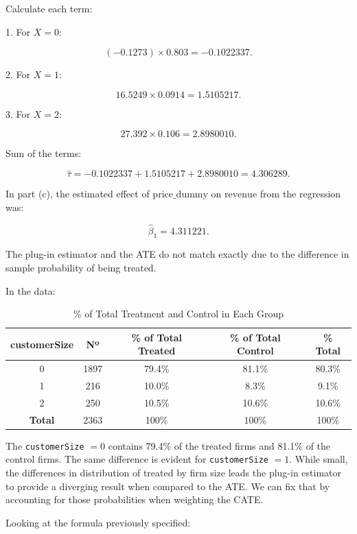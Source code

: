 \documentclass{article}
\begin{document}
Calculate each term:

1. For \(X = 0\):

\[
(-0.1273) \times 0.803 = -0.1022337.
\]

2. For \(X = 1\):

\[
16.5249 \times 0.0914 = 1.5105217.
\]

3. For \(X = 2\):

\[
27.392 \times 0.106 = 2.8980010.
\]

Sum of the terms:

\[
\hat{\tau} = -0.1022337 + 1.5105217 + 2.8980010 = 4.306289.
\]

In part (c), the estimated effect of \(\text{price\_dummy}\) on \(\text{revenue}\) from the regression was:

\[
\hat{\beta}_1 = 4.311221.
\]

The plug-in estimator and the ATE do not match exactly due to the difference in sample probability of being treated.

In the data:

\begin{table}[H]
    \centering
    \begin{tabular}{|c|c|c|c|c|}
    \hline
    \textbf{customerSize} & \textbf{Nº} & \textbf{\% of Total Treated}
    & \textbf{\% of Total Control} & \textbf{\% Total} \\
    \hline
    0 & 1897 & 79.4\% & 81.1\% & 80.3\% \\
    1 & 216 & 10.0\% & 8.3\% & 9.1\% \\
    2 & 250 & 10.5\% & 10.6\% & 10.6\% \\
    \hline
    \textbf{Total} & 2363 & 100\% & 100\% & 100\% \\
    \hline
    \end{tabular}
    \caption{\% of Total Treatment and Control in Each Group}
    \label{tab:earnings_distribution}
\end{table}

The \texttt{customerSize} $= 0$ contains 79.4\% of the treated firms and 81.1\% of the control firms.
The same difference is evident for \texttt{customerSize} $= 1$. While small, the differences in distribution of treated by firm size leads the plug-in estimator to provide a diverging result when compared to the ATE. We can fix that by accounting for those probabilities when weighting the CATE.

Looking at the formula previously specified:
\end{document}
